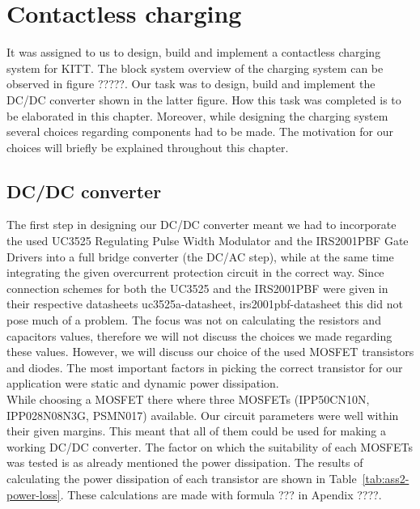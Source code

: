 \documentclass[11pt,titlepage]{report}
\begin{document}
\chapter{Contactless charging}
It was assigned to us to design, build and implement a contactless charging system for KITT. The block system overview of the charging system can be observed in figure ?????. Our task was to design, build and implement the DC/DC converter shown in the latter figure. How this task was completed is to be elaborated in this chapter. Moreover, while designing the charging system several choices regarding components had to be made. The motivation for our choices will briefly be explained throughout this chapter. \\



\section{DC/DC converter}
The first step in designing our DC/DC converter meant we had to incorporate the used UC3525 Regulating
Pulse Width Modulator and the IRS2001PBF Gate Drivers into a full bridge converter (the
DC/AC step), while at the same time integrating the given overcurrent protection circuit in the correct
way. Since connection schemes for both the UC3525 and the IRS2001PBF were given in their respective
datasheets uc3525a-datasheet, irs2001pbf-datasheet this did not pose much of a problem. The focus
was not on calculating the resistors and capacitors values, therefore we will not discuss the choices we
made regarding these values. However, we will discuss our choice of the used MOSFET transistors and
diodes. The most important factors in picking the correct transistor for our application were static and
dynamic power dissipation. \\
While choosing a MOSFET	there where three MOSFETs (IPP50CN10N, IPP028N08N3G, PSMN017) available. Our circuit parameters were well within their given margins. This meant that all of them could be used for making a working DC/DC converter. The factor on which the suitability of each MOSFETs was tested is as already mentioned the power dissipation. The results of calculating the power dissipation of each transistor are shown in Table~\ref{tab:ass2-power-loss}. These calculations are made with formula ??? in Apendix ????.
\end{document}
